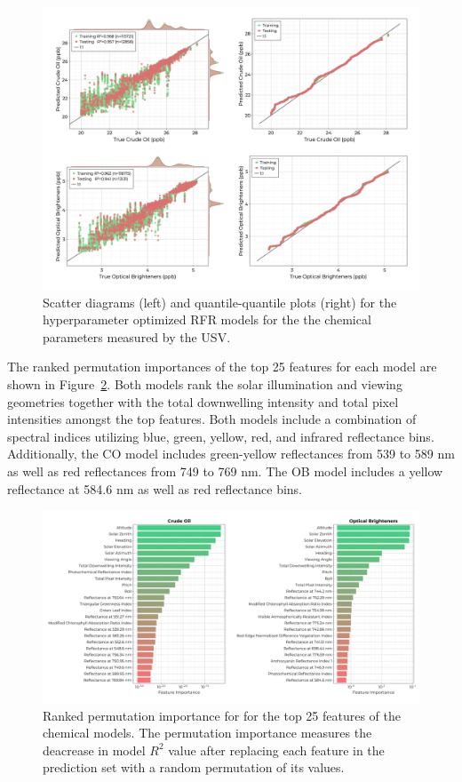 \documentclass[sensors,article,submit,pdftex,moreauthors]{Definitions/mdpi}
\begin{document}
\begin{figure}
\centering
\includegraphics[width=\columnwidth]{paper/figures/results/fits/chemical-fitres.png}
\caption{Scatter diagrams (left) and quantile-quantile plots (right) for the hyperparameter optimized RFR models for the the chemical parameters measured by the USV.\label{fig:chemicals-fit}}
\end{figure}  

The ranked permutation importances of the top 25 features for each model are shown in Figure~\ref{fig:chemicals-fi}. Both models rank the solar illumination and viewing geometries together with the total downwelling intensity and total pixel intensities amongst the top features. Both models include a combination of spectral indices utilizing blue, green, yellow, red, and infrared reflectance bins. Additionally, the CO model includes green-yellow reflectances from 539 to 589 nm as well as red reflectances from 749 to 769 nm. The OB model includes a yellow reflectance at 584.6 nm as well as red reflectance bins.

\begin{figure}
\centering
\includegraphics[width=\columnwidth]{paper/figures/results/fits/chemical-ranking.pdf}
\caption{Ranked permutation importance for for the top 25 features of the chemical models. The permutation importance measures the deacrease in model $R^2$ value after replacing each feature in the prediction set with a random permutation of its values.\label{fig:chemicals-fi}}
\end{figure}  
\end{document}
